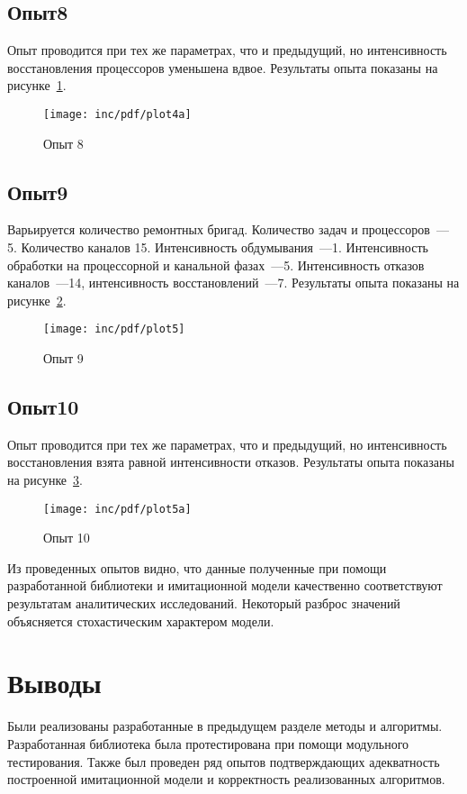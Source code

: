 \subsection*{Опыт8}

Опыт проводится при тех же параметрах, что и предыдущий, но интенсивность восстановления процессоров уменьшена вдвое. Результаты опыта показаны на рисунке~\ref{fig:plot4a}.

\begin{figure}[ht!]
  \centering
  \texttt{[image: inc/pdf/plot4a]}
  \caption{Опыт 8}
  \label{fig:plot4a}
\end{figure}

\subsection*{Опыт9}

Варьируется количество ремонтных бригад. Количество задач и процессоров~--- 5. Количество каналов 15. Интенсивность обдумывания~---1. Интенсивность обработки на процессорной и канальной фазах~---5. Интенсивность отказов каналов~---14, интенсивность восстановлений~---7. Результаты опыта показаны на рисунке~\ref{fig:plot5}.

\begin{figure}[ht!]
  \centering
  \texttt{[image: inc/pdf/plot5]}
  \caption{Опыт 9}
  \label{fig:plot5}
\end{figure}

\subsection*{Опыт10}

Опыт проводится при тех же параметрах, что и предыдущий, но интенсивность восстановления взята равной интенсивности отказов. Результаты опыта показаны на рисунке~\ref{fig:plot5a}.

\begin{figure}[ht!]
  \centering
  \texttt{[image: inc/pdf/plot5a]}
  \caption{Опыт 10}
  \label{fig:plot5a}
\end{figure}

Из проведенных опытов видно, что данные полученные при помощи разработанной библиотеки и имитационной модели качественно соответствуют результатам аналитических исследований. Некоторый разброс значений объясняется стохастическим характером модели.

\section{Выводы}

Были реализованы разработанные в предыдущем разделе методы и алгоритмы. Разработанная библиотека была протестирована при помощи модульного тестирования. Также был проведен ряд опытов подтверждающих адекватность построенной имитационной модели и корректность реализованных алгоритмов.
